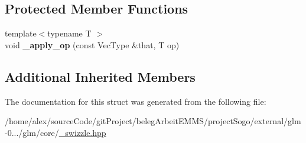 \subsection*{Protected Member Functions}
\begin{DoxyCompactItemize}
\item 
\hypertarget{structglm_1_1detail_1_1__swizzle__base2_adc355968d70e1f0b34759a8cb78ea6ae}{{\footnotesize template$<$typename T $>$ }\\void {\bfseries \-\_\-apply\-\_\-op} (const Vec\-Type \&that, T op)}\label{structglm_1_1detail_1_1__swizzle__base2_adc355968d70e1f0b34759a8cb78ea6ae}

\end{DoxyCompactItemize}
\subsection*{Additional Inherited Members}


The documentation for this struct was generated from the following file\-:\begin{DoxyCompactItemize}
\item 
/home/alex/source\-Code/git\-Project/beleg\-Arbeit\-E\-M\-M\-S/project\-Sogo/external/glm-\/0.../glm/core/\hyperlink{__swizzle_8hpp}{\-\_\-swizzle.\-hpp}\end{DoxyCompactItemize}
